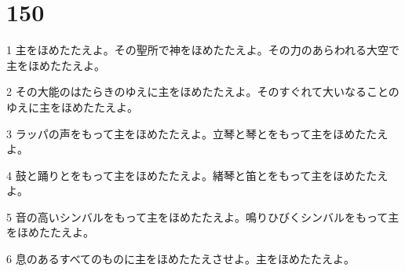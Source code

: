 \chapter{150}

\par 1 主をほめたたえよ。その聖所で神をほめたたえよ。その力のあらわれる大空で主をほめたたえよ。
\par 2 その大能のはたらきのゆえに主をほめたたえよ。そのすぐれて大いなることのゆえに主をほめたたえよ。
\par 3 ラッパの声をもって主をほめたたえよ。立琴と琴とをもって主をほめたたえよ。
\par 4 鼓と踊りとをもって主をほめたたえよ。緒琴と笛とをもって主をほめたたえよ。
\par 5 音の高いシンバルをもって主をほめたたえよ。鳴りひびくシンバルをもって主をほめたたえよ。
\par 6 息のあるすべてのものに主をほめたたえさせよ。主をほめたたえよ。


